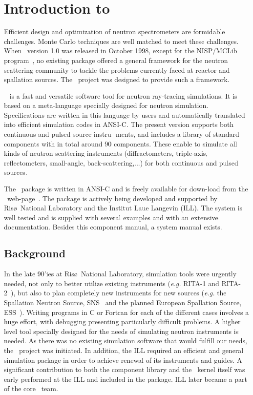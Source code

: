  
\chapter{Introduction to \MCS}

Efficient design and optimization of neutron spectrometers are
formidable challenges. Monte Carlo techniques are well matched to meet
these challenges. When \MCS\ version 1.0 was released in October
1998, except for the NISP/MCLib program~\cite{nisp_webpage}, no existing package offered a general framework for the neutron
scattering community to tackle the problems currently faced at reactor and
spallation sources. The \MCS\ project was designed to provide such a framework.

\MCS\ %
is a fast and versatile software tool for neutron ray-tracing simulations.
It is based on a meta-language specially designed for neutron
simulation. Specifications are written in this language by users and
automatically translated into efficient simulation codes in ANSI-C.
The present version supports both continuous and pulsed source instru-
ments, and includes a library of standard
components with in total around 90 components. These enable to simulate all kinds of neutron scattering instruments (diffractometers, triple-axis, reflectometers, small-angle, back-scattering,...) for both continuous and pulsed sources.

The \MCS\ package is written in ANSI-C and is freely available for down-load
from the \MCS\ web-page~\cite{mcstas_webpage}. The package is actively
being developed and supported by Ris\o\ National Laboratory 
and the Institut Laue Langevin (ILL). 
The system is well tested and
is supplied with several examples and with an extensive documentation.
Besides this component manual, a system manual exists.


\section{Background}

In the late 90'ies at Ris\o\ National Laboratory, 
simulation tools were urgently needed,
not only to better utilize existing instruments
({\em e.g.} RITA-1 and RITA-2~\cite{cjp_73_697,pb_241_50,pb_283_343}), 
but also to plan completely new instruments for new sources 
({\em e.g.} the Spallation Neutron Source, SNS~\cite{sns_webpage} 
and the planned European Spallation Source, ESS~\cite{ess_webpage}). 
Writing programs in C or Fortran for
each of the different cases involves a huge effort, with debugging presenting
particularly difficult problems. A higher level tool specially designed
for the needs of simulating neutron instruments is needed. As there was
no existing simulation software that would fulfill our needs, the \MCS\ 
project was initiated.
In addition, the ILL required an efficient and general simulation
package in order to achieve renewal of its instruments and guides. 
A significant contribution to both the component library and the \MCS\ 
kernel itself was early performed at the ILL and included in the package.
ILL later became a part of the core \MCS\ team.

